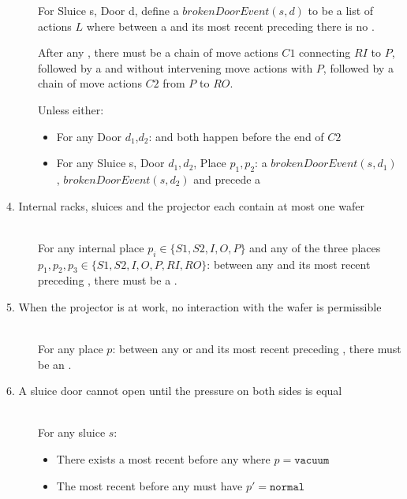\begin{description}
For Sluice s, Door d, define a $brokenDoorEvent(s,d)$  to be a list of actions $L$ where between a  and its most recent preceding  there is no .
 
 After any , there must be a chain of move actions $C1$ connecting $RI$ to $P$, followed by a  and  without intervening move actions with $P$, followed by a chain of move actions $C2$ from $P$ to $RO$.
 
 Unless either:
 \begin{itemize}
 \item For any Door $d_1$,$d_2$:  and  both happen before the end of $C2$
 
 \item For any Sluice s, Door $d_1,d_2$, Place $p_1,p_2$: a $brokenDoorEvent(s,d_1)$ , $brokenDoorEvent(s,d_2)$ and   precede a  
 \end{itemize}
 
 
\item[4. Internal racks, sluices and the projector each contain at most one wafer] \hfill \\
For any internal place $p_i \in \{S1, S2, I, O, P\}$ and any of the three places $p_1, p_2, p_3 \in \{S1, S2, I, O, P, RI, RO\}$: between any  and its most recent preceding , there must be a . 
 
\item[5. When the projector is at work, no interaction with the wafer is permissible] \hfill \\
For any place $p$: between any  or  and its most recent preceding , there must be an . 
 
 \item[6. A sluice door cannot open until the pressure on both sides is equal] \hfill \\
 For any sluice $s$:
 \begin{itemize}
  \item There exists a most recent  before any  where $p = \texttt{vacuum}$
  \item The most recent  before any  must have $p' = \texttt{normal}$


\end{itemize}
\end{description}
